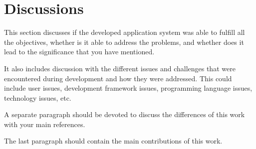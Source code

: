 \section{Discussions}

This section discusses if the developed application system was able to fulfill all the objectives, whether is it able to address the problems,
and whether does it lead to the significance that you have mentioned.

It also includes discussion with the different issues and challenges that were encountered during development and how they were addressed. 
This could include user issues, development framework issues, programming language issues, technology issues, etc.

A separate paragraph should be devoted to discuss the differences of this work with your main references.

The last paragraph should contain the main contributions of this work. 
